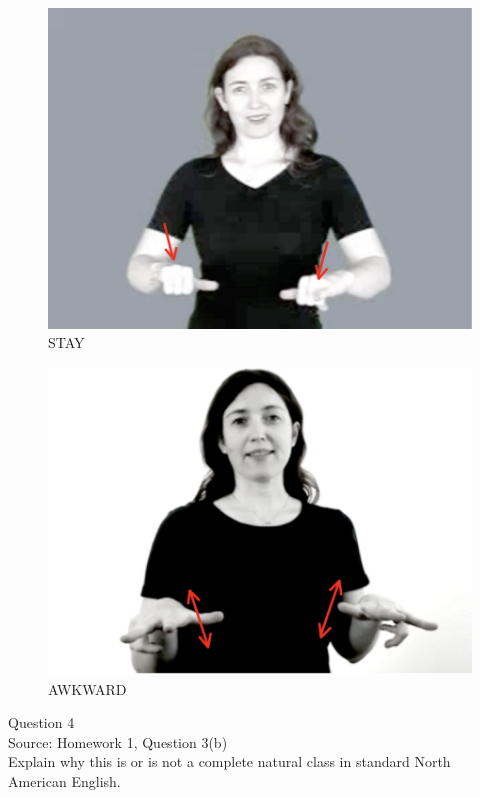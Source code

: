 \documentclass[12pt]{article}
\begin{document}
\begin{figure}[H]
\includegraphics{../images/asl_stay.png}
\caption{STAY}
\end{figure}
\begin{figure}[H]
\includegraphics{../images/asl_awkward.png}
\caption{AWKWARD}
\end{figure}

\newpage

{\large Question 4}\\

Source: Homework 1, Question 3(b)\\

Explain why this is or is not a complete natural class in standard North American English.\\
\end{document}
